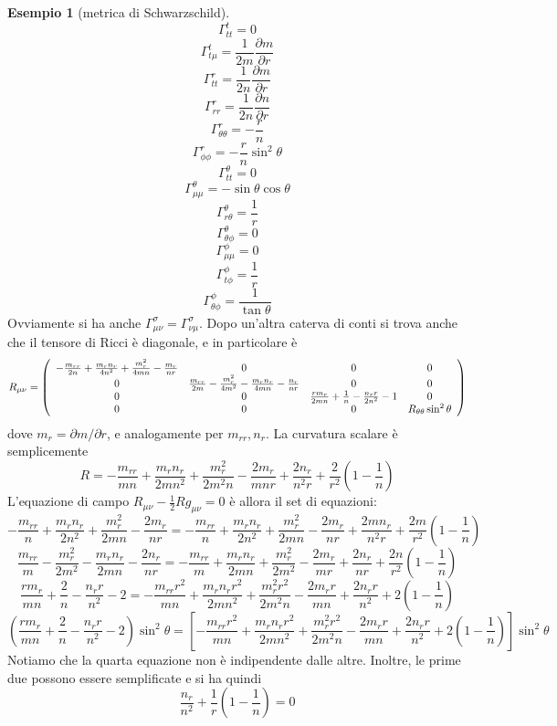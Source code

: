 \documentclass[a4paper,11pt]{article}
\theoremstyle{definition}
\newtheorem{esempio}{Esempio}[section]
\theoremstyle{theorem}
\begin{document}
\begin{esempio}[metrica di Schwarzschild]
	\[\Gamma^{t}_{tt}=0\]
	\[\Gamma^{t}_{t\mu}=\frac{1}{2m}\frac{\partial m}{\partial r}\]
	\[\Gamma^{r}_{tt}=\frac{1}{2n}\frac{\partial m}{\partial r}\]
	\[\Gamma^{r}_{rr}=\frac{1}{2n}\frac{\partial n}{\partial r}\]
	\[\Gamma^{r}_{\theta\theta}=-\frac{r}{n}\]
	\[\Gamma^{r}_{\phi\phi}=-\frac{r}{n}\sin^2\theta\]
	\[\Gamma^{\theta}_{tt}=0\]
	\[\Gamma^{\theta}_{\mu\mu}=-\sin\theta\cos\theta\]
	\[\Gamma^{\theta}_{r\theta}=\frac{1}{r}\]
	\[\Gamma^{\theta}_{\theta\phi}=0\]
	\[\Gamma^{\phi}_{\mu\mu}=0\]
	\[\Gamma^{\phi}_{t\phi}=\frac{1}{r}\]
	\[\Gamma^{\phi}_{\theta\phi}=\frac{1}{\tan\theta}\]
	Ovviamente si ha anche $\Gamma^\sigma_{\mu\nu}=\Gamma^{\sigma}_{\nu\mu}$. Dopo un'altra caterva di conti si trova anche che il tensore di Ricci è diagonale, e in particolare è
	\[R_{\mu\nu}=\left(\begin{array}{c c c c}
	-\frac{m_{rr}}{2n}+\frac{m_rn_r}{4n^2}+\frac{m^2_r}{4mn}-\frac{m_r}{nr}&0&0&0\\0&\frac{m_{rr}}{2m}-\frac{m_r^2}{4m^2}-\frac{m_rn_r}{4mn}-\frac{n_r}{nr}&0&0\\
	0&0&\frac{rm_r}{2mn}+\frac{1}{n}-\frac{n_rr}{2n^2}-1&0\\
	0&0&0&R_{\theta\theta}\sin^2\theta
	\end{array}\right)\]
	dove $m_r=\partial m/\partial r$, e analogamente per $m_{rr},n_{r}$. La curvatura scalare è semplicemente
	\[R=-\frac{m_{rr}}{mn}+\frac{m_rn_r}{2mn^2}+\frac{m_r^2}{2m^2n}-\frac{2m_r}{mnr}+\frac{2n_r}{n^2r}+\frac{2}{r^2}\left(1-\frac{1}{n}\right)\]
	L'equazione di campo $R_{\mu\nu}-\frac{1}{2}Rg_{\mu\nu}=0$ è allora il set di equazioni:
	\[-\frac{m_{rr}}{n}+\frac{m_rn_r}{2n^2}+\frac{m_r^2}{2mn}-\frac{2m_r}{nr}=-\frac{m_{rr}}{n}+\frac{m_rn_r}{2n^2}+\frac{m_r^2}{2mn}-\frac{2m_r}{nr}+\frac{2mn_r}{n^2r}+\frac{2m}{r^2}\left(1-\frac{1}{n}\right)\]
	\[\frac{m_{rr}}{m}-\frac{m_r^2}{2m^2}-\frac{m_rn_r}{2mn}-\frac{2n_r}{nr}=-\frac{m_{rr}}{m}+\frac{m_rn_r}{2mn}+\frac{m_r^2}{2m^2}-\frac{2m_r}{mr}+\frac{2n_r}{nr}+\frac{2n}{r^2}\left(1-\frac{1}{n}\right)\]
	\[\frac{rm_r}{mn}+\frac{2}{n}-\frac{n_rr}{n^2}-2=-\frac{m_{rr}r^2}{mn}+\frac{m_rn_rr^2}{2mn^2}+\frac{m_r^2r^2}{2m^2n}-\frac{2m_rr}{mn}+\frac{2n_rr}{n^2}+2\left(1-\frac{1}{n}\right)\]
	\[\left(\frac{rm_r}{mn}+\frac{2}{n}-\frac{n_rr}{n^2}-2\right)\sin^2\theta=\left[-\frac{m_{rr}r^2}{mn}+\frac{m_rn_rr^2}{2mn^2}+\frac{m_r^2r^2}{2m^2n}-\frac{2m_rr}{mn}+\frac{2n_rr}{n^2}+2\left(1-\frac{1}{n}\right)\right]\sin^2\theta\]
	Notiamo che la quarta equazione non è indipendente dalle altre. Inoltre, le prime due possono essere semplificate e si ha quindi
	\[\frac{n_r}{n^2}+\frac{1}{r}\left(1-\frac{1}{n}\right)=0\]

\end{esempio}
\end{document}
